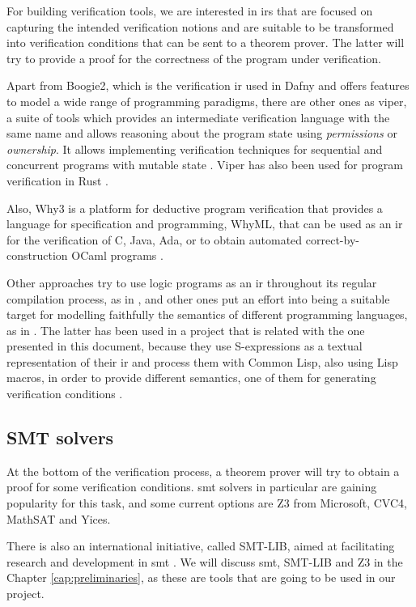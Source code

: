 For building verification tools, we are interested in \gls{ir}s that are focused
on capturing the intended verification notions and are suitable to be
transformed into verification conditions that can be sent to a theorem prover.
The latter will try to provide a proof for the correctness of the program under
verification.

Apart from Boogie2, which is the verification \gls{ir} used in Dafny and offers 
features to model a wide range of programming paradigms, there are other ones as
\gls{viper}, a suite of tools which provides an intermediate verification
language with the same name and allows reasoning about the program state using
\textit{permissions} or \textit{ownership}. It allows implementing verification
techniques for sequential and concurrent programs with mutable state
\citep{viper}. Viper has also been used for program verification in Rust 
\citep{astrauskas2022prusti}.

Also, Why3 \citep{Why3} is a platform for deductive program verification that
provides a language for specification and programming, WhyML, that can be used
as an \gls{ir} for the verification of C, Java, Ada, or to obtain automated
correct-by-construction OCaml programs \citep{Why3Manual}.

Other approaches try to use logic programs as an \gls{ir} throughout its regular
compilation process, as in \cite{horn}, and other ones put an effort into being
a suitable target for modelling faithfully the semantics of different
programming languages, as in \cite{caviart}. The latter has been used in a
project that is related with the one presented in this document, because they
use S-expressions as a textual representation of their \gls{ir} and process them
with Common Lisp, also using Lisp macros, in order to provide different
semantics, one of them for generating verification conditions \citep{cavilisp}.

\subsection{SMT solvers}

At the bottom of the verification process, a theorem prover will try to obtain a
proof for some verification conditions. \acrshort{smt} solvers in particular are
gaining popularity for this task, and some current options are Z3 from
Microsoft, CVC4, MathSAT and Yices. 

There is also an international initiative, called SMT-LIB, aimed at facilitating
research and development in \gls{smt} \citep{smtLibStandard}. We will discuss 
\gls{smt}, SMT-LIB and Z3 in the Chapter \ref{cap:preliminaries}, as these are
tools that are going to be used in our project.

